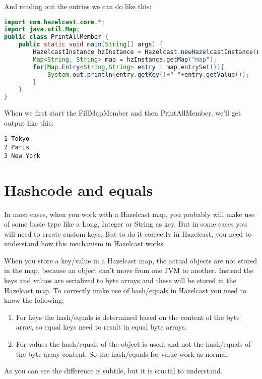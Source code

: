 And reading out the entries we can do like this:
\begin{lstlisting}[language=java]
import com.hazelcast.core.*;
import java.util.Map;
public class PrintAllMember {
    public static void main(String[] args) {
        HazelcastInstance hzInstance = Hazelcast.newHazelcastInstance(null);
        Map<String, String> map = hzInstance.getMap("map");
        for(Map.Entry<String,String> entry : map.entrySet()){
            System.out.println(entry.getKey()+" "+entry.getValue());
        }
    }
}
\end{lstlisting}
When we first start the FillMapMember and then PrintAllMember, we'll get output like this:
\begin{lstlisting}
1 Tokyo
2 Paris
3 New York
\end{lstlisting}

\section{Hashcode and equals}
In most cases, when you work with a Hazelcast map, you probably will make use of some basic type like a  Long, Integer or String as key. But in some cases you will need to create custom keys. But to do it correctly in Hazelcast, you need to understand how this mechanism in Hazelcast works. 

When you store a key/value in a Hazelcast map, the actual objects are not stored in the map, because an object can't move from one JVM to another. Instead the keys and values are serialized to byte arrays and these will be stored in the Hazelcast map. To correctly make use of hash/equals in Hazelcast you need to know the following:
\begin{enumerate}
\item For keys the hash/equals is determined based on the content of the byte array, so equal keys need to result in equal byte arrays.
\item For values the hash/equals of the object is used, and not the hash/equals of the byte array content. So the hash/equals for value work as normal.
\end{enumerate}
As you can see the difference is subtile, but it is crucial to understand.

